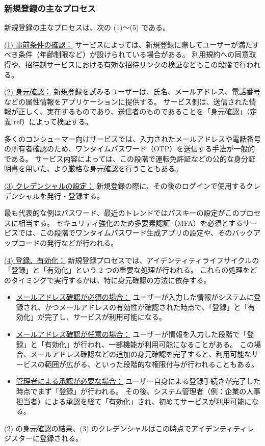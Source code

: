 \documentclass[uplatex]{jsarticle}
\def\ref#1{ref}%
\def\label#1{}%
\begin{document}
\subsubsection{新規登録の主なプロセス}

新規登録の主なプロセスは、次の (1)〜(5) である。

\underline{(1) 事前条件の確認：}
サービスによっては、新規登録に際してユーザーが満たすべき条件（年齢制限など）が設けられている場合がある。
利用規約への同意取得や、招待制サービスにおける有効な招待リンクの検証などもこの段階で行われる。

\underline{(2) 身元確認：}
新規登録を試みるユーザーは、氏名、メールアドレス、電話番号などの属性情報をアプリケーションに提供する。
サービス側は、送信された情報が正しく、実在するものであり、送信者のものであることを「身元確認」（定義 \ref{dfn:identity-proofing}）によって検証する。

\begin{exa}[新規登録における身元確認の手法]\label{exa:ch3-signup-proofing-methods}
多くのコンシューマー向けサービスでは、入力されたメールアドレスや電話番号の所有者確認のため、ワンタイムパスワード（OTP）を送信する手法が一般的である。
サービス内容によっては、この段階で運転免許証などの公的な身分証明書を用いた、より厳格な身元確認を行うこともある。
\end{exa}

\underline{(3) クレデンシャルの設定：}
新規登録の際に、その後のログインで使用するクレデンシャルを発行・登録する。

\begin{exa}[クレデンシャルの設定の例]\label{exa:ch3-credential-setup}
最も代表的な例はパスワード、最近のトレンドではパスキーの設定がこのプロセスに相当する。
セキュリティ強化のため多要素認証（MFA）を必須とするサービスでは、この段階でワンタイムパスワード生成アプリの設定や、そのバックアップコードの発行などが行われる。
\end{exa}

\underline{(4) 登録、有効化：}
新規登録プロセスでは、アイデンティティライフサイクルの「登録」と「有効化」という 2 つの重要な処理が行われる。
これらの処理をどのタイミングで実行するかは、特に身元確認の方法に依存する。
\begin{itemize}
\item \underline{メールアドレス確認が必須の場合：}
ユーザーが入力した情報がシステムに登録され、かつメールアドレスの有効性が確認された時点で、「登録」と「有効化」が完了し、サービスが利用可能になる。
\item \underline{メールアドレス確認が任意の場合：}
ユーザーが情報を入力した段階で「登録」と「有効化」が行われ、一部機能が利用可能になることがある。
この場合、メールアドレス確認などの追加の身元確認を完了すると、利用可能なサービスの範囲が広がる、といった段階的な権限付与が行われることもある。
\item \underline{管理者による承認が必要な場合：}
ユーザー自身による登録手続きが完了した時点でまず「登録」が行われる。
その後、システム管理者（例：企業の人事担当者）による承認を経て「有効化」され、初めてサービスが利用可能になる。
\end{itemize}
(2) の身元確認の結果、(3) のクレデンシャルはこの時点でアイデンティティレジスターに登録される。
\end{document}
